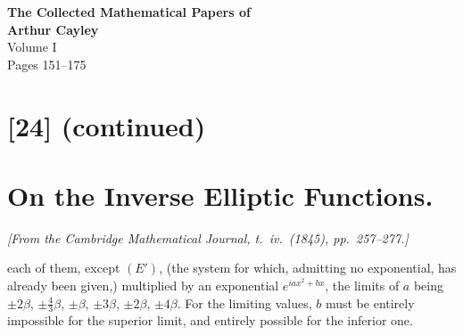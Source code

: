 \documentclass[12pt,a4paper]{article}
\begin{document}

\begin{center}
{\LARGE\bfseries The Collected Mathematical Papers of}\\[0.5em]
{\LARGE\bfseries Arthur Cayley}\\[1em]
{\Large Volume I}\\[1em]
{\large Pages 151--175}\\[2em]
\end{center}

\tableofcontents
\newpage

\section*{[24] (continued)}
\section*{On the Inverse Elliptic Functions.}

\textit{[From the Cambridge Mathematical Journal, t.~iv.~(1845), pp.~257--277.]}

\bigskip
\setcounter{page}{151}

each of them, except $(E')$, (the system for which, admitting no exponential, has already been given,) multiplied by an exponential $e^{iax^2+bx}$, the limits of $a$ being $\pm 2\beta$, $\pm\tfrac{4}{3}\beta$, $\pm\beta$, $\pm 3\beta$, $\pm 2\beta$, $\pm 4\beta$. For the limiting values, $b$ must be entirely impossible for the superior limit, and entirely possible for the inferior one.
\end{document}
